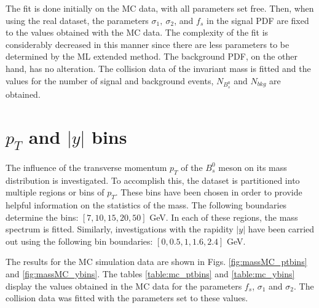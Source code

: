 The fit is done initially on the MC data, with all parameters set free. Then, when using the real dataset, the parameters $\sigma_1, \ \sigma_2$, and $f_s$ in the signal PDF are fixed to the values obtained with the MC data. The complexity of the fit is considerably decreased in this manner since there are less parameters to be determined by the ML extended method. The background PDF, on the other hand, has no alteration. The collision data of the invariant mass is fitted and the values for the number of signal and background events, $N_{B^0_s}$ and $N_{bkg}$ are obtained. 

\section{$p_T$ and $|y|$ bins}

The influence of the transverse momentum $p_T$ of the $B_s^0$ meson on its mass distribution is investigated. To accomplish this, the dataset is partitioned into multiple regions or bins of $p_T$. These bins have been chosen in order to provide helpful information on the statistics of the mass. The following boundaries determine the bins: $[7, 10, 15, 20, 50]$ GeV. In each of these regions, the mass spectrum is fitted. Similarly, investigations with the rapidity $|y|$ have been carried out using the following bin boundaries: $[0, 0.5, 1, 1.6, 2.4]$ GeV.


The results for the MC simulation data are shown in Figs. \ref{fig:massMC_ptbins} and \ref{fig:massMC_ybins}. The tables \ref{table:mc_ptbins} and \ref{table:mc_ybins} display the values obtained in the MC data for the parameters $f_s$, $\sigma_1$ and $\sigma_2$. The collision data was fitted with the parameters set to these values.


